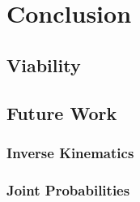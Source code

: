 \chapter{Conclusion}
\section{Viability}
\section{Future Work}
\subsection{Inverse Kinematics}
\subsection{Joint Probabilities}